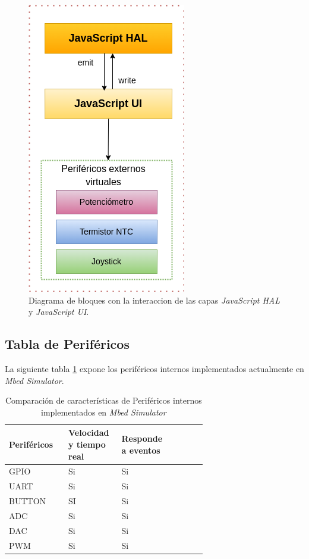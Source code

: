 \begin{figure}[ht]
	\centering
	\includegraphics[scale=.57]{./Figures/uiADC.png}
	\caption{Diagrama de bloques con la interaccion de las capas  \textit{JavaScript HAL} y \textit{JavaScript UI}.}
	\label{fig:uiADC}
\end{figure}

\hfill \break
\hfill \break
\hfill \break
\hfill \break
\hfill \break
\hfill \break
\hfill \break
\hfill \break
\hfill \break
\hfill \break
\hfill \break
\hfill \break

\subsection{Tabla de Periféricos}

La siguiente tabla \ref{tab:perifericosInternosMBED} expone los  periféricos internos implementados actualmente en \textit{Mbed Simulator}.

\begin{table}[h]
\centering
\caption[Comparación de características de periféricos internos implementados en \textit{Mbed Simulator}]{Comparación de características de Periféricos internos implementados en \textit{Mbed Simulator}}
\begin{tabular}{p{0.24\linewidth} p{0.14\linewidth}  p{0.14\linewidth}  p{0.14\linewidth}}
\toprule
\textbf{Periféricos} 
& \textbf{Velocidad y tiempo real}
& \textbf{Responde a eventos}
\\
\midrule
GPIO & Si & Si  \\
UART & Si & Si \\
BUTTON & SI & Si \\
ADC & Si & Si \\
DAC & Si & Si \\
PWM & Si & Si \\ 
\bottomrule
\hline
\end{tabular}
\label{tab:perifericosInternosMBED}
\end{table}


